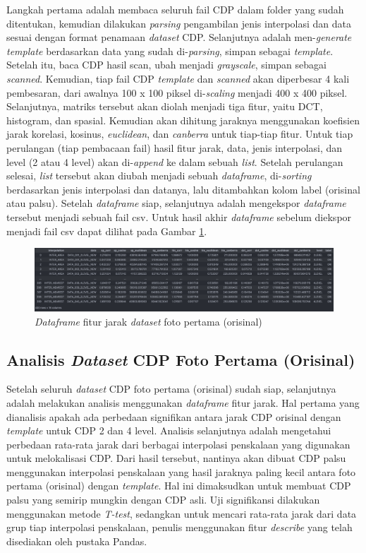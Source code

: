 Langkah pertama adalah membaca seluruh fail CDP dalam folder yang sudah ditentukan, kemudian dilakukan \emph{parsing} pengambilan jenis interpolasi dan data
sesuai dengan format penamaan \emph{dataset} CDP. Selanjutnya adalah men-\emph{generate} \emph{template} berdasarkan data yang sudah di-\emph{parsing}, simpan
sebagai \emph{template}. Setelah itu, baca CDP hasil scan, ubah menjadi \emph{grayscale}, simpan sebagai \emph{scanned}. Kemudian, tiap fail CDP
\emph{template} dan \emph{scanned} akan diperbesar 4 kali pembesaran, dari awalnya 100 x 100 piksel di-\emph{scaling} menjadi 400 x 400 piksel. Selanjutnya,
matriks tersebut akan diolah menjadi tiga fitur, yaitu DCT, histogram, dan spasial. Kemudian akan dihitung jaraknya menggunakan koefisien jarak korelasi,
kosinus, \emph{euclidean}, dan \emph{canberra} untuk tiap-tiap fitur. Untuk tiap perulangan (tiap pembacaan fail) hasil fitur jarak, data, jenis interpolasi,
dan level (2 atau 4 level) akan di-\emph{append} ke dalam sebuah \emph{list}. Setelah perulangan selesai, \emph{list} tersebut akan diubah menjadi sebuah
\emph{dataframe}, di-\emph{sorting} berdasarkan jenis interpolasi dan datanya, lalu ditambahkan kolom label (orisinal atau palsu). Setelah \emph{dataframe}
siap, selanjutnya adalah mengekspor \emph{dataframe} tersebut menjadi sebuah fail csv. Untuk hasil akhir \emph{dataframe} sebelum diekspor menjadi fail csv
dapat dilihat pada Gambar \ref{Fig: 3-dataframefitur}.

\begin{figure}[h]
	\centering
	\includegraphics[width=\textwidth]{contents/chapter-3/3-dataframefitur.png}
	\caption{\emph{Dataframe} fitur jarak \emph{dataset} foto pertama (orisinal)}
	\label{Fig: 3-dataframefitur}
\end{figure}

\subsection{Analisis \emph{Dataset} CDP Foto Pertama (Orisinal)} Setelah seluruh \emph{dataset} CDP foto pertama (orisinal) sudah siap, selanjutnya adalah melakukan analisis menggunakan
\emph{dataframe} fitur jarak. Hal pertama yang dianalisis apakah ada perbedaan signifikan antara jarak CDP orisinal dengan \emph{template} untuk CDP 2 dan 4
level. Analisis selanjutnya adalah mengetahui perbedaan rata-rata jarak dari berbagai interpolasi penskalaan yang digunakan untuk melokalisasi CDP. Dari hasil
tersebut, nantinya akan dibuat CDP palsu menggunakan interpolasi penskalaan yang hasil jaraknya paling kecil antara foto pertama (orisinal) dengan
\emph{template}. Hal ini dimaksudkan untuk membuat CDP palsu yang semirip mungkin dengan CDP asli. Uji signifikansi dilakukan menggunakan metode \emph{T-test},
sedangkan untuk mencari rata-rata jarak dari data grup tiap interpolasi penskalaan, penulis menggunakan fitur \emph{describe} yang telah disediakan oleh
pustaka Pandas.

